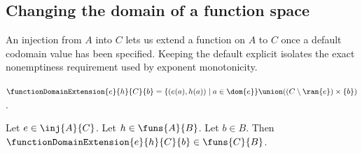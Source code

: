 \subsection{Changing the domain of a function space}

An injection from $A$ into $C$ lets us extend a function on $A$ to $C$ once
a default codomain value has been specified.  Keeping the default explicit
isolates the exact nonemptiness requirement used by exponent monotonicity.

\begin{definition}\label{function_domain_extension}
    $\functionDomainExtension{e}{h}{C}{b}
        =\{(e(a),h(a))\mid a\in\dom{e}\}
            \union((C\setminus\ran{e})\times\{b\})$.
\end{definition}

\begin{proposition}\label{function_domain_extension_type}
    Let $e\in\inj{A}{C}$.
    Let $h\in\funs{A}{B}$.
    Let $b\in B$.
    Then $\functionDomainExtension{e}{h}{C}{b}\in\funs{C}{B}$.
\end{proposition}
